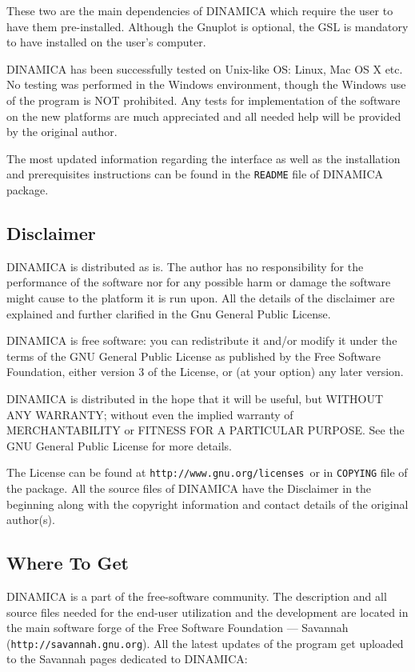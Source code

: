 \documentclass[11pt,a4paper]{article}
\begin{document}
These two are the main dependencies of DINAMICA which require the user to have them
pre-installed. Although the Gnuplot is optional, the GSL is mandatory to have
installed on the user's computer.

DINAMICA has been successfully tested on Unix-like OS: Linux, Mac OS X etc. No
testing was performed in the Windows environment, though the Windows use of the
program is NOT prohibited. Any tests for implementation of the software on the new
platforms are much appreciated and all needed help will be provided by the original
author.

The most updated information regarding the interface as well as the installation and
prerequisites instructions can be found in the \texttt{README} file of DINAMICA
package.

\subsection{Disclaimer}
\label{sec:disclaimer}

DINAMICA is distributed as is. The author has no responsibility for the performance of
the software nor for any possible harm or damage the software might cause to the
platform it is run upon. All the details of the disclaimer are explained and further
clarified in the Gnu General Public License.

DINAMICA is free software: you can redistribute it and/or modify it under the terms
of the GNU General Public License as published by the Free Software Foundation,
either version 3 of the License, or (at your option) any later version.

DINAMICA is distributed in the hope that it will be useful, but WITHOUT ANY WARRANTY;
without even the implied warranty of MERCHANTABILITY or FITNESS FOR A PARTICULAR
PURPOSE. See the GNU General Public License for more details.

The License can be found at \texttt{http://www.gnu.org/licenses}\, or in
\texttt{COPYING} file of the package. All the source files of DINAMICA have the
Disclaimer in the beginning along with the copyright information and contact details
of the original author(s).

\subsection{Where To Get}
\label{sec:where-get}

DINAMICA is a part of the free-software community. The description and all source
files needed for the end-user utilization and the development are located in the main
software forge of the Free Software Foundation --- Savannah
(\texttt{http://savannah.gnu.org}). All the latest updates of the program get
uploaded to the Savannah pages dedicated to DINAMICA:
\end{document}
